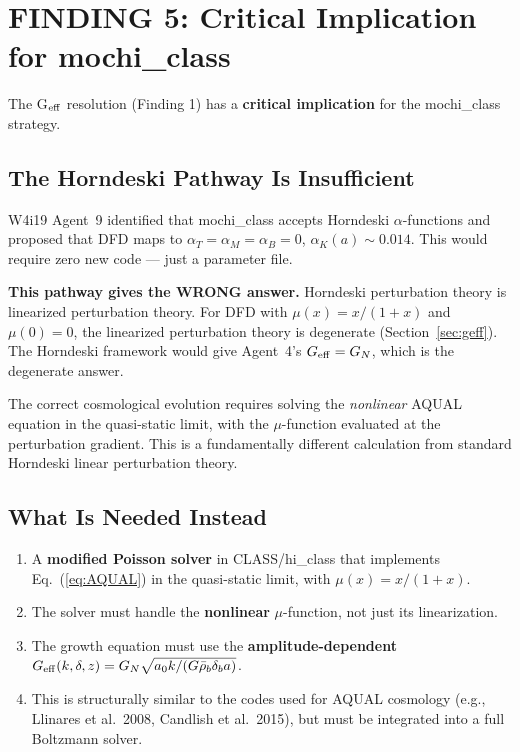 \documentclass[11pt]{article}
\newcommand{\Geff}{G_{\rm eff}}
\newcommand{\GN}{G_N}
\begin{document}
\section{FINDING 5: Critical Implication for mochi\_class}
\label{sec:mochi}

The G$_{\rm eff}$ resolution (Finding 1) has a \textbf{critical implication}
for the mochi\_class strategy.

\subsection{The Horndeski Pathway Is Insufficient}

W4i19 Agent~9 identified that mochi\_class accepts Horndeski
$\alpha$-functions and proposed that DFD maps to
$\alpha_T = \alpha_M = \alpha_B = 0$, $\alpha_K(a) \sim 0.014$.
This would require zero new code --- just a parameter file.

\textbf{This pathway gives the WRONG answer.} Horndeski perturbation theory
is linearized perturbation theory. For DFD with $\mu(x) = x/(1+x)$ and
$\mu(0) = 0$, the linearized perturbation theory is degenerate
(Section~\ref{sec:geff}). The Horndeski framework would give Agent~4's
$\Geff = \GN$, which is the degenerate answer.

The correct cosmological evolution requires solving the \emph{nonlinear}
AQUAL equation in the quasi-static limit, with the $\mu$-function evaluated
at the perturbation gradient. This is a fundamentally different calculation
from standard Horndeski linear perturbation theory.

\subsection{What Is Needed Instead}

\begin{enumerate}
\item A \textbf{modified Poisson solver} in CLASS/hi\_class that implements
  Eq.~(\ref{eq:AQUAL}) in the quasi-static limit, with $\mu(x) = x/(1+x)$.
\item The solver must handle the \textbf{nonlinear} $\mu$-function, not
  just its linearization.
\item The growth equation must use the \textbf{amplitude-dependent}
  $\Geff(k, \delta, z) = \GN\sqrt{a_0 k / (G\bar\rho_b \delta_b a)}$.
\item This is structurally similar to the codes used for AQUAL cosmology
  (e.g., Llinares et al.\ 2008, Candlish et al.\ 2015), but must be
  integrated into a full Boltzmann solver.
\end{enumerate}
\end{document}
